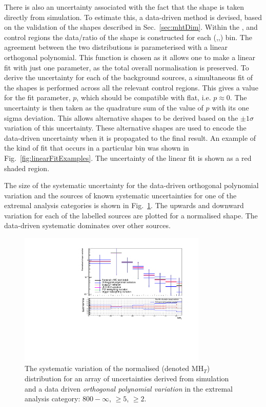 There is also an uncertainty associated with the fact that the \MHT shape
is taken directly from simulation. To estimate this, a data-driven
method is devised, based on the validation of the \MHT shapes
described in Sec.~\ref{sec:mhtDim}. Within the \mj, \mmj and \gj
control regions the data/\MC ratio of the \MHT shape is
constructed for each (\HT,\nj,\nb) bin. The agreement between the two
distributions is parameterised with a linear orthogonal polynomial.
This function is chosen as it allows one to make a linear fit with
just one parameter, as the total overall normalisation is preserved.
To derive the uncertainty for each of the background sources,
a simultaneous fit of the \MHT shapes is performed across
all the relevant control regions. This gives a value for the fit
parameter, $p$, which should be compatible with flat, i.e.
$p\approx0$. The uncertainty is then taken as the quadrature sum of
the value of $p$ with its one sigma deviation. This allows alternative
\MHT shapes to be derived based on the $\pm 1\sigma$ variation of this
uncertainty. These alternative shapes are used to encode the
data-driven uncertainty when it is propagated to the final result. An
example of the kind of fit that occurs in a particular bin was shown
in Fig.~\ref{fig:linearFitExamples}. The uncertainty of the linear fit is shown as a red
shaded region.

The size of the systematic uncertainty for the data-driven orthogonal
polynomial variation and the sources of known systematic uncertainties
for one of the extremal analysis categories is shown in
Fig.~\ref{fig:mcCompLow}.
The upwards and downward variation for each of the labelled sources
are plotted for a normalised \MHT shape. The data-driven systematic
dominates over other sources.

\begin{figure}[h!]
  \centering
  \includegraphics[width=0.8\textwidth]{figs/analysis/mhtShape/totalSMS-T1tttt_mGluino-1000_mLSP-100_25ns_mht_ge5j_ge3b_800.pdf}
  \caption{The systematic variation of the normalised \MHT (denoted MH$_T$)
  distribution for an array of uncertainties derived from simulation
  and a data driven \emph{orthogonal polynomial variation} in the
  extremal analysis category: \scalht $800-\infty$, \njet $\geq 5$, \nb $\geq 2$.}
  \label{fig:mcCompLow}
\end{figure}

